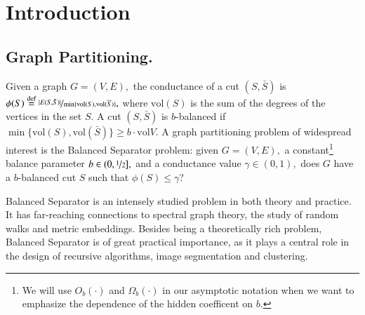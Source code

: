 \documentclass[twoside,leqno,twocolumn]{article}
\newcommand{\nfrac}{\nicefrac}
\renewcommand{\leq}{\leqslant}
\renewcommand{\geq}{\geqslant}
\newcommand{\vol}{\mathrm{vol}}
\newcommand{\defeq}{\stackrel{\textup{def}}{=}}
\newcommand{\BS}{{\sc Balanced Separator}\xspace}
\numberwithin{equation}{section}
\begin{document}
\section{Introduction}


\subsection{Graph Partitioning.}
Given a graph $G=(V,E),$  the conductance of
a cut $(S,\bar{S})$ is  $\phi(S) \defeq \nfrac{|E(S,\bar{S})|}{\min
\{\vol(S),\vol (\overline{S})\}},$ where $\vol(S)$ is the sum of the degrees of the vertices in the set $S$. 
A cut $(S, \bar{S})$ is $b$-balanced if $\min \{\vol(S), \vol(\bar{S})\} \geq b \cdot \vol{V}.$ 
A graph partitioning problem of widespread interest is the  \BS  problem: given $G=(V,E),$ a constant\footnote{
We will use $O_b(\cdot)$ and $\Omega_b(\cdot)$ in our asymptotic notation when we want to emphasize the dependence of the hidden coefficent on $b.$}
balance parameter $b \in (0,\nfrac{1}{2}],$ and a conductance value $\gamma \in (0,1),$ does $G$ have a $b$-balanced cut $S$ such that $\phi(S) \leq \gamma$?

\BS is an intensely studied problem in both theory and practice.  
It has far-reaching connections to spectral graph theory, the study of random walks and metric embeddings. Besides being a theoretically rich problem, \BS is of great practical importance, as it plays a central role in the design of recursive algorithms, image segmentation and clustering. 
\end{document}

